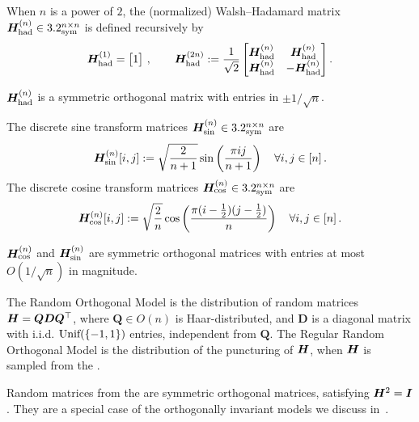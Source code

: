 \begin{definition}
    \label{def:hadamard}
    When $n$ is a power of $2$, the (normalized) Walsh--Hadamard matrix ${\bm H}_{\textnormal{had}}^{(n)}\in3.2_{\mathrm{sym}}^{n\times n}$ is defined 
    recursively by
    \[
        {\bm H}_{\textnormal{had}}^{(1)}=\begin{bmatrix}1\end{bmatrix}\,,\qquad 
        {\bm H}_{\textnormal{had}}^{(2n)} := \frac{1}{\sqrt{2}}
        \begin{bmatrix}
        {\bm H}_{\textnormal{had}}^{(n)} & {\bm H}_{\textnormal{had}}^{(n)}\\
        {\bm H}_{\textnormal{had}}^{(n)} & -{\bm H}_{\textnormal{had}}^{(n)}
        \end{bmatrix}.
    \]
\end{definition}
\noindent
${\bm H}_{\textnormal{had}}^{(n)}$ is a 
symmetric orthogonal matrix with entries in $\pm 1/\sqrt n$.


\begin{definition}
    \label{def:dst}
    The discrete sine transform matrices
    ${\bm H}_{\sin}^{(n)}\in3.2^{n\times n}_{\mathrm{sym}}$ are
    \[
        {\bm H}_{\sin}^{(n)}[i,j] := \sqrt{\frac 2 {n+1}} \sin\left(\frac {\pi ij}{n+1}\right)\quad \forall i,j\in [n]\,.
    \]
    The discrete cosine transform matrices
    ${\bm H}_{\cos}^{(n)}\in3.2^{n\times n}_{\mathrm{sym}}$ are 
    \[
        {\bm H}_{\cos}^{(n)}[i,j]:= \sqrt{\frac 2n}\cos\left(\frac{\pi(i-\tfrac12)(j-\tfrac12)}{n}\right)\quad \forall i,j\in [n]\,.
    \]
\end{definition}
\noindent
${\bm H}_{\cos}^{(n)}$ and ${\bm H}_{\sin}^{(n)}$ are
symmetric orthogonal matrices with entries
at most $O(1/\sqrt n)$ in magnitude.

\begin{definition}
\label{def:rom}
    The {Random Orthogonal Model} \rom is the
    distribution of random matrices ${\bm H} = \bm Q \bm D \bm Q^\top$, where $\bm Q\in O(n)$ is
    Haar-distributed, and $\bm D$ is a diagonal
    matrix with i.i.d. $\textnormal{Unif}(\{-1,1\})$ entries, independent from $\bm Q$.
    The {Regular Random Orthogonal Model} \rrom is the distribution of the puncturing of
    ${\bm H}$, when ${\bm H}$ is sampled from the \rom.
\end{definition}
\noindent
Random matrices from the \rom are symmetric orthogonal matrices, satisfying ${\bm H}^2 = \bm I$.
They are a special case of the
orthogonally invariant models we discuss in~.

